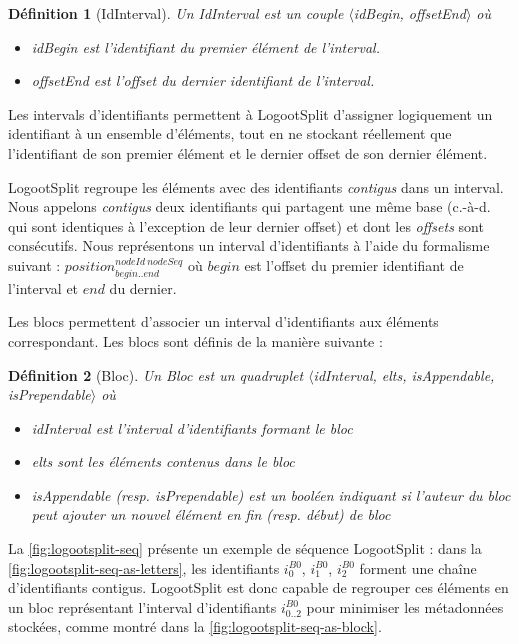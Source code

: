 \documentclass[12pt]{thesul}
\newtheorem{definition}{Définition}
\newcommand{\ie}{c.-à-d. }
\newcommand{\trm}[1]{\mathit{#1}}
\newcommand{\id}[3]{$\trm{#1}^{\trm{#2}}_{\trm{#3}}$}
\begin{document}
\begin{definition}[IdInterval]
  Un \emph{IdInterval} est un couple $\langle$idBegin, offsetEnd$\rangle$ où
  \begin{itemize}
    \item idBegin est l'identifiant du premier élément de l'interval.
    \item offsetEnd est l'offset du dernier identifiant de l'interval.
  \end{itemize}
\end{definition}

Les intervals d'identifiants permettent à LogootSplit d'assigner logiquement un identifiant à un ensemble d'éléments, tout en ne stockant réellement que l'identifiant de son premier élément et le dernier offset de son dernier élément.

LogootSplit regroupe les éléments avec des identifiants \emph{contigus} dans un interval.
Nous appelons \emph{contigus} deux identifiants qui partagent une même base (\ie qui sont identiques à l'exception de leur dernier offset) et dont les \emph{offsets} sont consécutifs.
Nous représentons un interval d'identifiants à l'aide du formalisme suivant : \id{position}{nodeId~nodeSeq}{begin..end} où $\trm{begin}$ est l'offset du premier identifiant de l'interval et $\trm{end}$ du dernier.

Les blocs permettent d'associer un interval d'identifiants aux éléments correspondant.
Les blocs sont définis de la manière suivante :

\begin{definition}[Bloc]
  Un \emph{Bloc} est un quadruplet $\langle$idInterval, elts, isAppendable, isPrependable$\rangle$ où
  \begin{itemize}
    \item idInterval est l'interval d'identifiants formant le bloc
    \item elts sont les éléments contenus dans le bloc
    \item isAppendable (resp. isPrependable) est un booléen indiquant si l'auteur du bloc peut ajouter un nouvel élément en fin (resp. début) de bloc
  \end{itemize}
\end{definition}

La \autoref{fig:logootsplit-seq} présente un exemple de séquence LogootSplit : dans la \autoref{fig:logootsplit-seq-as-letters}, les identifiants \id{i}{B0}{0}, \id{i}{B0}{1}, \id{i}{B0}{2} forment une chaîne d'identifiants contigus.
LogootSplit est donc capable de regrouper ces éléments en un bloc représentant l'interval d'identifiants \id{i}{B0}{0..2} pour minimiser les métadonnées stockées, comme montré dans la \autoref{fig:logootsplit-seq-as-block}.
\end{document}
